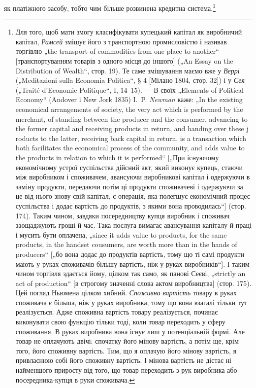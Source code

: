 як платіжного засобу, тобто чим більше розвинена кредитна система.\footnote{
Для того, щоб мати змогу класифікувати купецький капітал як виробничий
капітал, \emph{Рамсей} змішує його з транспортною промисловістю і називав
торгівлю „the transport of commodities from one place to another“ [транспортуванням
товарів з одного місця до іншого] („An Essay on the Distribution of
Wealth“, стор. 19). Те саме змішування маємо вже у \emph{Веррі} („Meditazioni sulla
Economia Politica“, § 4 [Мілано 1804, стор. 32]) і у \emph{Сея} („Traité d’Economie
Politique“, I, 14--15). — В своїх „Elements of Political Economy“ (Andover і
New Jork 1835) І.~P. \emph{Newman} каже: „In the existing economical arrangements of
society, the very act which is performed by the merchant, of standing between the
producer and the consumer, advancing to the former capital and receiving products
in return, and handing over these j roducts to the latter, receiving back capital in
return, is a transaction which both facilitates the economical process of the community,
and adds value to the products in relation to which it is performed“ [„При існуючому
економічному устрої суспільства дійсний акт, який виконує купець,
стаючи між виробником і споживачем, авансуючи виробникові капітал і одержуючи
в заміну продукти, передаючи потім ці продукти споживачеві і одержуючи
за це від нього знову свій капітал, є операція, яка полегшує економічний
процес суспільства і додає вартість до продуктів, з якими вона проводилась“]
(стор. 174). Таким чином, завдяки посередництву купця виробник і споживач
заощаджують гроші й час. Така послуга вимагає авансування капіталу й праці
і мусить бути оплачена, „since it adds value to products, for the same products,
in the handset cousumers, are worth more than in the hands of producers“ [„бо вона
додає до продуктів вартість, тому що ті самі продукти мають у руках споживачів
більшу вартість, ніж у руках виробників“]. І таким чином торгівля
здається йому, цілком так само, як панові Сеєві, „strictly an act of production“
[в строгому значенні слова актом виробництва] (стор. 175). Цей погляд Ньюмена
цілком хибний. \emph{Споживна вартість} товару в руках споживача є більша, ніж у
руках виробника, тому що вона взагалі тільки тут реалізується. Адже споживна
вартість товару реалізується, починає виконувати свою функцію тільки тоді,
коли товар переходить у сферу споживання. В руках виробника вона існує лиш
у потенціальній формі. Але товар не оплачують двічі: спочатку його мінову
вартість, а потім ще, крім того, його споживну вартість. Тим, що я оплачую
його мінову вартість, я привласнюю собі його споживну вартість. І мінова вартість
не дістає ні найменшого приросту від того, що товар переходить з рук
виробника або посередника-купця в руки споживача.
}

